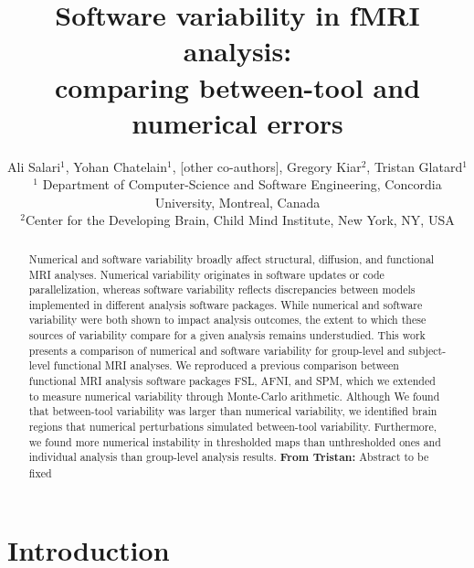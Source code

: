 \documentclass[11pt,onecolumn]{article}
\begin{document}
\newcommand{\fslspm}{FSL-SPM\xspace}
\newcommand{\fslafni}{FSL-AFNI\xspace}
\newcommand{\afnispm}{AFNI-SPM\xspace}
\newcommand{\tristan}[1]{\color{orange}\textbf{From Tristan:} #1\color{black}\xspace}
\newcommand{\ali}[2]{\color{green}\textbf{Ali:} #1\color{black}\xspace}
\newcommand{\discuss}[1]{\uwave{#1}}


\title{Software variability in fMRI analysis:\\ comparing between-tool and numerical errors}

\author{Ali Salari$^1$, Yohan Chatelain$^1$, [other co-authors], Gregory Kiar$^2$, Tristan Glatard$^1$ \\
$^1$ Department of Computer-Science and Software Engineering, Concordia University, Montreal, Canada\\
$^2$Center for the Developing Brain, Child Mind Institute, New York, NY, USA}

\maketitle
\begin{abstract}

Numerical and software variability broadly affect structural, diffusion, and functional MRI analyses. Numerical
variability originates in software updates or code
parallelization, whereas software variability reflects discrepancies between
models implemented in different analysis software packages. While numerical
and software variability were both shown to impact analysis outcomes, the
extent to which these sources of variability compare for a given
analysis remains understudied. This work presents a comparison of
numerical and software variability for group-level and subject-level functional MRI analyses.
We reproduced a previous comparison between functional MRI analysis
software packages FSL, AFNI, and SPM, which we extended to measure
numerical variability through Monte-Carlo arithmetic.
Although We found that between-tool variability was larger than numerical variability,
we identified brain regions that numerical perturbations simulated between-tool variability.
Furthermore, we found more numerical instability in thresholded maps than unthresholded ones
and individual analysis than group-level analysis results. \tristan{Abstract to be fixed}

\end{abstract}

\section{Introduction}
\end{document}
